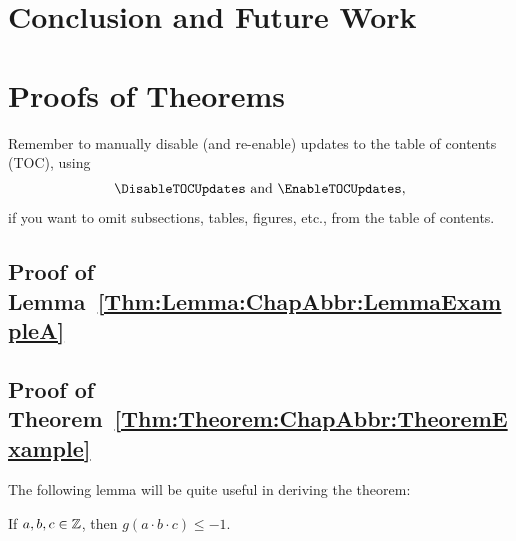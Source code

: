 \section{Conclusion and Future Work}
\label{Section:ChapAbbr:Conclusion}

\lipsum[14-15]


\section{Proofs of Theorems}
\label{Section:ChapAbbr:ProofsOfTheorems}

\noindent
{\color{red}%
Remember to manually disable (and re-enable) updates to the table of contents (TOC), using
\[
\verb|\DisableTOCUpdates|
\text{ and }
\verb|\EnableTOCUpdates|,
\]
if you want to omit subsections, tables, figures, etc., from the table of contents.}


\DisableTOCUpdates


\subsection{Proof of Lemma~\ref{Thm:Lemma:ChapAbbr:LemmaExampleA}}

\lipsum[16-17]
\qedmarker


\subsection{Proof of Theorem~\ref{Thm:Theorem:ChapAbbr:TheoremExample}}

\lipsum[18]

The following lemma will be quite useful in deriving the theorem:

\begin{Thm:Lemma}
\label{Thm:Lemma:ChapAbbr:LemmaExampleB}
If \mbox{$a,b,c\in{\mathbb{Z}}$}, then \mbox{$g(a\cdot b\cdot c) \leq -1$}.
\end{Thm:Lemma}

